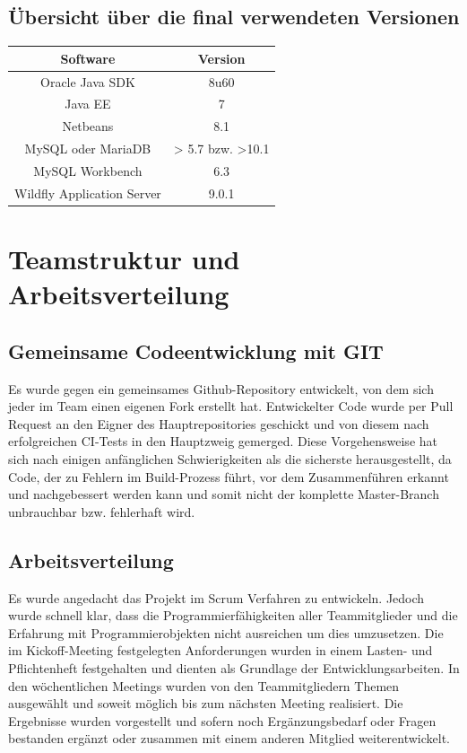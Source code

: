 \documentclass[12pt,a4paper,parskip]{scrreprt}
\begin{document}
\section{Übersicht über die final verwendeten Versionen}
\begin{center}
\begin{tabular}{|c|c|}
\hline
\rule[-1ex]{0pt}{2.5ex} Software & Version  \\ 
\hline 
\rule[-1ex]{0pt}{2.5ex} Oracle Java SDK & 8u60  \\ 
\hline 
\rule[-1ex]{0pt}{2.5ex} Java EE & 7 \\ 
\hline 
\rule[-1ex]{0pt}{2.5ex} Netbeans & 8.1 \\ 
\hline 
\rule[-1ex]{0pt}{2.5ex} MySQL oder MariaDB & > 5.7 bzw. >10.1 \\ 
\hline 
\rule[-1ex]{0pt}{2.5ex} MySQL Workbench & 6.3 \\ 
\hline
\rule[-1ex]{0pt}{2.5ex} Wildfly Application Server & 9.0.1 \\ 
\hline 
\end{tabular}
\end{center}
\chapter{Teamstruktur und Arbeitsverteilung}
\section{Gemeinsame Codeentwicklung mit GIT}
Es wurde gegen ein gemeinsames Github-Repository entwickelt, von dem sich jeder im Team einen eigenen Fork erstellt hat. Entwickelter Code wurde per Pull Request an den Eigner des Hauptrepositories geschickt und von diesem nach erfolgreichen CI-Tests in den Hauptzweig gemerged. Diese Vorgehensweise hat sich nach einigen anfänglichen Schwierigkeiten als die sicherste herausgestellt, da Code, der zu Fehlern im Build-Prozess führt, vor dem Zusammenführen erkannt und nachgebessert werden kann und somit nicht der komplette Master-Branch unbrauchbar bzw. fehlerhaft wird.
\section{Arbeitsverteilung}
Es wurde angedacht das Projekt im Scrum Verfahren zu entwickeln. Jedoch wurde schnell klar, dass die Programmierfähigkeiten aller Teammitglieder und die Erfahrung mit Programmierobjekten nicht ausreichen um dies umzusetzen.
Die im Kickoff-Meeting festgelegten Anforderungen wurden in einem Lasten- und Pflichtenheft festgehalten und dienten als Grundlage der Entwicklungsarbeiten. In den wöchentlichen Meetings wurden von den Teammitgliedern Themen ausgewählt und soweit möglich bis zum nächsten Meeting realisiert. Die Ergebnisse wurden vorgestellt und sofern noch Ergänzungsbedarf oder Fragen bestanden ergänzt oder zusammen mit einem anderen Mitglied weiterentwickelt.
\end{document}
